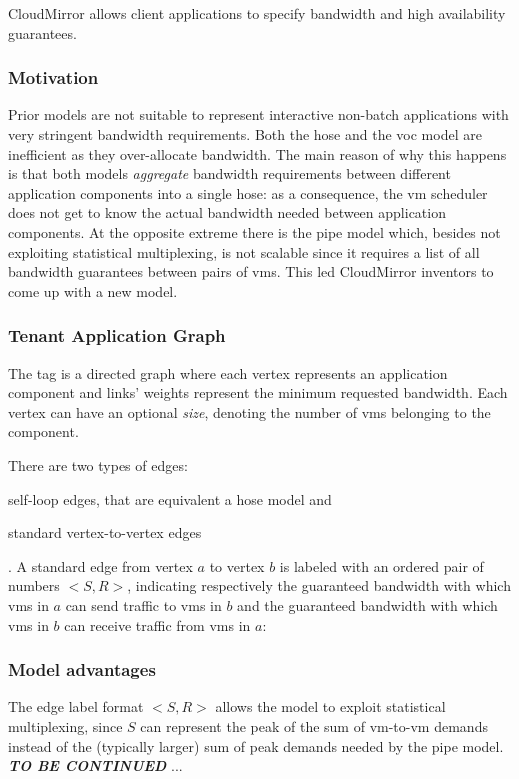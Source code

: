 CloudMirror \cite{cloudmirror} allows client applications to specify bandwidth and high availability guarantees.

\subsubsection{Motivation}
Prior models are not suitable to represent interactive non-batch applications with very stringent bandwidth requirements.
Both the hose and the \gls{voc} model are inefficient as they over-allocate bandwidth.
The main reason of why this happens is that both models \textit{aggregate} bandwidth requirements between different application components into a single hose: as a consequence, the \gls{vm} scheduler does not get to know the actual bandwidth needed between application components.
At the opposite extreme there is the pipe model which, besides not exploiting statistical multiplexing, is not scalable since it requires a list of all bandwidth guarantees between pairs of \glspl{vm}.
This led CloudMirror \cite{cloudmirror} inventors to come up with a new model.

\subsubsection{Tenant Application Graph}
The \gls{tag} is a directed graph where each vertex represents an application component and links' weights represent the minimum requested bandwidth. Each vertex can have an optional \textit{size}, denoting the number of \glspl{vm} belonging to the component.\par
There are two types of edges:
\begin{mylist}
    \item self-loop edges, that are equivalent a hose model and
    \item standard vertex-to-vertex edges
\end{mylist}.
A standard edge from vertex $a$ to vertex $b$ is labeled with an ordered pair of numbers $<S, R>$, indicating respectively the guaranteed bandwidth with which \glspl{vm} in $a$ can send traffic to \glspl{vm} in $b$ and the guaranteed bandwidth with which \glspl{vm} in $b$ can receive traffic from \glspl{vm} in $a$: 

\subsubsection{Model advantages}
The edge label format $<S, R>$ allows the model to exploit statistical multiplexing, since $S$ can represent the peak of the sum of \gls{vm}-to-\gls{vm} demands instead of the (typically larger) sum of peak demands needed by the pipe model.
\textbf{\textit{TO BE CONTINUED}} ...


